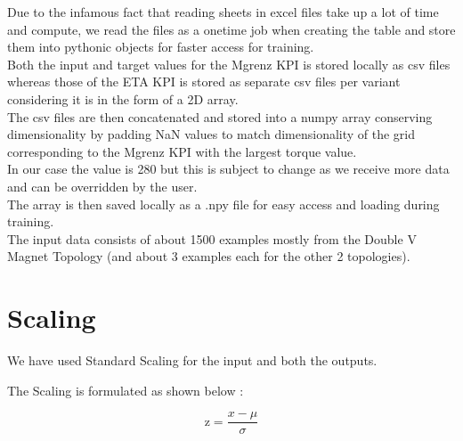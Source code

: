 \documentclass{report} %
\begin{document}
Due to the infamous fact that reading sheets in excel files take up a lot of time and compute, we read the files as a onetime job when creating the table and store them into pythonic objects for faster access for training.\\
Both the input and target values for the Mgrenz \ac{KPI} is stored locally as csv files whereas those of the ETA \ac{KPI} is stored as separate csv files per variant considering it is in the form of a \ac{2D} array.\\
The csv files are then concatenated and stored into a numpy array conserving dimensionality by padding \ac{NaN} values to match dimensionality of the grid corresponding to the Mgrenz \ac{KPI} with the largest torque value.\\
In our case the value is 280 but this is subject to change as we receive more data and can be overridden by the user.\\
The array is then saved locally as a .npy file for easy access and loading during training.\\

The input data consists of about 1500 examples mostly from the Double V Magnet Topology (and about 3 examples each for the other 2 topologies).\\ 

\section{Scaling}\label{sec:Scaling}

We have used Standard Scaling for the input and both the outputs.

The Scaling is formulated as shown below :

\begin{equation}
    \text{z} = \frac{x - \mu}{\sigma}
    \label{eq:Standard Scaling}
\end{equation} 

\end{document}
